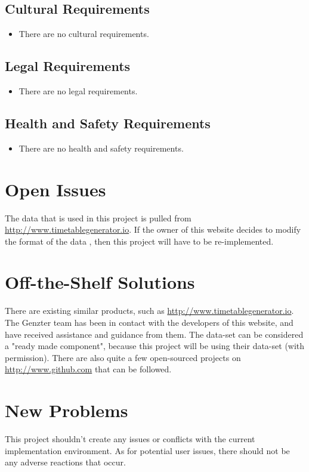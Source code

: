 \documentclass[12pt]{article}
\begin{document}
\subsection{Cultural Requirements}
\begin{itemize}
    \item There are no cultural requirements.
\end{itemize}

\subsection{Legal Requirements}
\begin{itemize}
    \item There are no legal requirements.
\end{itemize}

\subsection{Health and Safety Requirements}
\begin{itemize}
    \item There are no health and safety requirements.
\end{itemize}

\newpage

\section{Open Issues}

\tab The data that is used in this project is pulled from \url{http://www.timetablegenerator.io}. If the owner of this website decides to modify the format of the data , then this project will have to be re-implemented. 


\section{Off-the-Shelf Solutions}
There are existing similar products, such as \url{http://www.timetablegenerator.io}. The Genzter team has been in contact with the developers of this website, and have received assistance and guidance from them. The data-set can be considered a "ready made component", because this project will be using their data-set (with permission). There are also quite a few open-sourced projects on \url{http://www.github.com} that can be followed.

\section{New Problems}
This project shouldn't create any issues or conflicts with the current implementation environment. As for potential user issues, there should not be any adverse reactions that occur.
\end{document}

